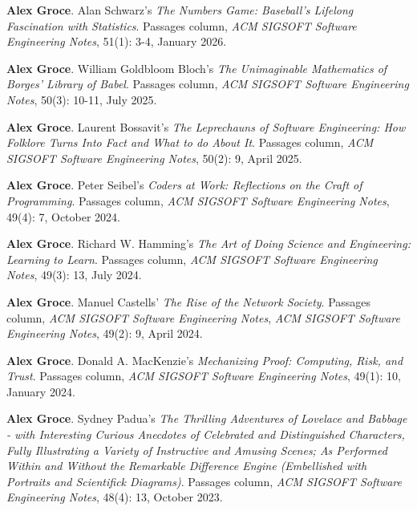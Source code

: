 \documentclass[ComputerScience]{vita}
\begin{document}
\begin{vita}
\begin{Columns, Book Reviews, and Magazine Articles}
\item{\bf Alex Groce}. 
  \newblock Alan Schwarz's \emph{The Numbers Game: Baseball’s Lifelong Fascination with Statistics}. 
  \newblock Passages column, \emph{ACM SIGSOFT Software Engineering 
  Notes}, 51(1): 3-4, January 2026.  
  
\item {\bf Alex Groce}. 
  \newblock William Goldbloom Bloch's \emph{The Unimaginable Mathematics of Borges’ Library of Babel}. 
  \newblock Passages column, \emph{ACM SIGSOFT Software Engineering 
  Notes}, 50(3): 10-11, July 2025.
  
\item {\bf Alex Groce}. 
  \newblock Laurent Bossavit's \emph{The Leprechauns of Software Engineering: How Folklore Turns Into Fact and What to do About It}. 
  \newblock Passages column, \emph{ACM SIGSOFT Software Engineering 
  Notes}, 50(2): 9, April 2025.
  
\item {\bf Alex Groce}. 
  \newblock Peter Seibel's \emph{Coders at Work: Reflections on the Craft of Programming}. 
  \newblock Passages column, \emph{ACM SIGSOFT Software Engineering 
  Notes}, 49(4): 7, October 2024.

  
\item {\bf Alex Groce}.
  \newblock Richard W. Hamming's \emph{The Art of Doing Science and Engineering: Learning to Learn}.
  \newblock Passages column, \emph{ACM SIGSOFT Software Engineering 
  Notes}, 49(3): 13, July 2024.
  
\item {\bf Alex Groce}.
  \newblock Manuel Castells' \emph{The Rise of the Network Society}.
  \newblock Passages column, \emph{ACM SIGSOFT Software Engineering 
  Notes}, \emph{ACM SIGSOFT Software Engineering Notes}, 49(2): 9, April 2024.
  
\item {\bf Alex Groce}.
  \newblock Donald A. MacKenzie's \emph{Mechanizing Proof: Computing, Risk, and Trust}.
  \newblock Passages column, \emph{ACM SIGSOFT Software Engineering 
  Notes}, 49(1): 10, January 2024.
  
\item {\bf Alex Groce}.
  \newblock Sydney Padua's \emph{The Thrilling Adventures of Lovelace and Babbage - with Interesting Curious Anecdotes of Celebrated and Distinguished Characters, Fully Illustrating a Variety of Instructive and Amusing Scenes; As Performed Within and Without the Remarkable Difference Engine (Embellished with Portraits and Scientifick Diagrams)}.
  \newblock Passages column, \emph{ACM SIGSOFT Software Engineering 
  Notes}, 48(4): 13, October 2023.
  

\end{Columns, Book Reviews, and Magazine Articles}
\end{vita}
\end{document}
